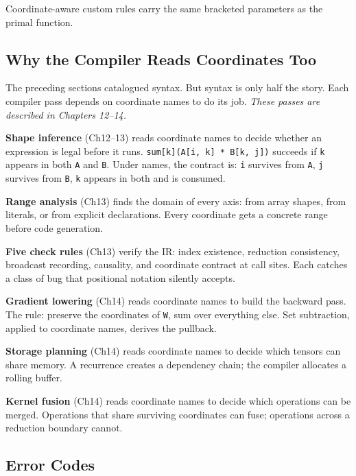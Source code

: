 \documentclass[11pt,titlepage]{article}
\begin{document}
Coordinate-aware custom rules carry the same bracketed parameters as the
primal function.

\vspace{2em}

\hypertarget{why-the-compiler-reads-coordinates-too}{%
\subsection{Why the Compiler Reads Coordinates
Too}\label{why-the-compiler-reads-coordinates-too}}

The preceding sections catalogued syntax. But syntax is only half the
story. Each compiler pass depends on coordinate names to do its job.
\emph{These passes are described in Chapters 12--14.}

\textbf{Shape inference} (Ch12--13) reads coordinate names to decide
whether an expression is legal before it runs.
\texttt{sum{[}k{]}(A{[}i,\ k{]}\ *\ B{[}k,\ j{]})} succeeds if
\texttt{k} appears in both \texttt{A} and \texttt{B}. Under names, the
contract is: \texttt{i} survives from \texttt{A}, \texttt{j} survives
from \texttt{B}, \texttt{k} appears in both and is consumed.

\textbf{Range analysis} (Ch13) finds the domain of every axis: from
array shapes, from literals, or from explicit declarations. Every
coordinate gets a concrete range before code generation.

\textbf{Five check rules} (Ch13) verify the IR: index existence,
reduction consistency, broadcast recording, causality, and coordinate
contract at call sites. Each catches a class of bug that positional
notation silently accepts.

\textbf{Gradient lowering} (Ch14) reads coordinate names to build the
backward pass. The rule: preserve the coordinates of \texttt{W}, sum
over everything else. Set subtraction, applied to coordinate names,
derives the pullback.

\textbf{Storage planning} (Ch14) reads coordinate names to decide which
tensors can share memory. A recurrence creates a dependency chain; the
compiler allocates a rolling buffer.

\textbf{Kernel fusion} (Ch14) reads coordinate names to decide which
operations can be merged. Operations that share surviving coordinates
can fuse; operations across a reduction boundary cannot.

\vspace{2em}

\hypertarget{error-codes}{%
\subsection{Error Codes}\label{error-codes}}
\end{document}
